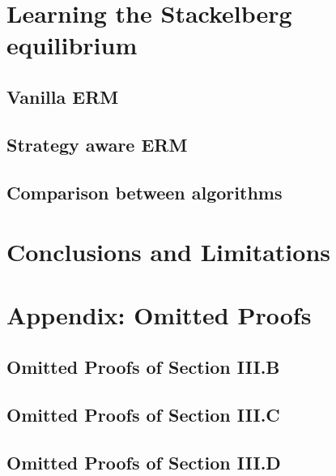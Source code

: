 \documentclass[journal, 12pt, onecolumn]{IEEEtran}
\theoremstyle{plain}
\theoremstyle{definition}
\begin{document}
	

	\section{Learning the Stackelberg equilibrium}\label{sec:Learning problem}

	

	\subsection{Vanilla ERM}\label{subsec:Vanilla ERM}
%
	

	\subsection{Strategy aware ERM}\label{subsec:Stragically aware ERM}
%
	

	\subsection{Comparison between algorithms}\label{subsec:comparision}

	

	\section{Conclusions and Limitations}

	

	\section{Appendix: Omitted Proofs}

        \subsection{Omitted Proofs of Section III.B}

        

        \subsection{Omitted Proofs of Section III.C}

        

        \subsection{Omitted Proofs of Section III.D}
\end{document}
